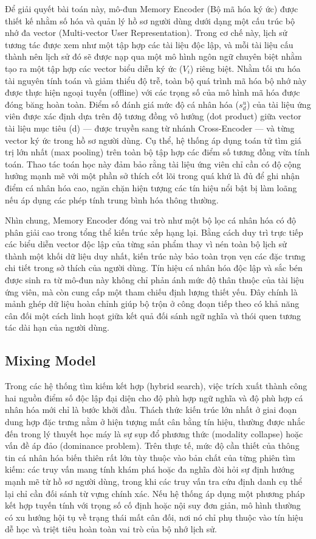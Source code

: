 Để giải quyết bài toán này, mô-đun Memory Encoder (Bộ mã hóa ký ức) được thiết kế nhằm số hóa và quản lý hồ sơ người dùng dưới dạng một cấu trúc bộ nhớ đa vector (Multi-vector User Representation). Trong cơ chế này, lịch sử tương tác được xem như một tập hợp các tài liệu độc lập, và mỗi tài liệu cấu thành nên lịch sử đó sẽ được nạp qua một mô hình ngôn ngữ chuyên biệt nhằm tạo ra một tập hợp các vector biểu diễn ký ức ($V_i$) riêng biệt. Nhằm tối ưu hóa tài nguyên tính toán và giảm thiểu độ trễ, toàn bộ quá trình mã hóa bộ nhớ này được thực hiện ngoại tuyến (offline) với các trọng số của mô hình mã hóa được đóng băng hoàn toàn. Điểm số đánh giá mức độ cá nhân hóa ($s_d^u$) của tài liệu ứng viên được xác định dựa trên độ tương đồng vô hướng (dot product) giữa vector tài liệu mục tiêu (d) — được truyền sang từ nhánh Cross-Encoder — và từng vector ký ức trong hồ sơ người dùng. Cụ thể, hệ thống áp dụng toán tử tìm giá trị lớn nhất (max pooling) trên toàn bộ tập hợp các điểm số tương đồng vừa tính toán. Thao tác toán học này đảm bảo rằng tài liệu ứng viên chỉ cần có độ cộng hưởng mạnh mẽ với một phần sở thích cốt lõi trong quá khứ là đủ để ghi nhận điểm cá nhân hóa cao, ngăn chặn hiện tượng các tín hiệu nổi bật bị làm loãng nếu áp dụng các phép tính trung bình hóa thông thường.

Nhìn chung, Memory Encoder đóng vai trò như một bộ lọc cá nhân hóa có độ phân giải cao trong tổng thể kiến trúc xếp hạng lại. Bằng cách duy trì trực tiếp các biểu diễn vector độc lập của từng sản phẩm thay vì nén toàn bộ lịch sử thành một khối dữ liệu duy nhất, kiến trúc này bảo toàn trọn vẹn các đặc trưng chi tiết trong sở thích của người dùng. Tín hiệu cá nhân hóa độc lập và sắc bén được sinh ra từ mô-đun này không chỉ phản ánh mức độ thân thuộc của tài liệu ứng viên, mà còn cung cấp một tham chiếu định lượng thiết yếu. Đây chính là mảnh ghép dữ liệu hoàn chỉnh giúp bộ trộn ở công đoạn tiếp theo có khả năng cân đối một cách linh hoạt giữa kết quả đối sánh ngữ nghĩa và thói quen tương tác dài hạn của người dùng.


\subsection{Mixing Model}

Trong các hệ thống tìm kiếm kết hợp (hybrid search), việc trích xuất thành công hai nguồn điểm số độc lập đại diện cho độ phù hợp ngữ nghĩa và độ phù hợp cá nhân hóa mới chỉ là bước khởi đầu. Thách thức kiến trúc lớn nhất ở giai đoạn dung hợp đặc trưng nằm ở hiện tượng mất cân bằng tín hiệu, thường được nhắc đến trong lý thuyết học máy là sự sụp đổ phương thức (modality collapse) hoặc vấn đề áp đảo (dominance problem). Trên thực tế, mức độ cần thiết của thông tin cá nhân hóa biến thiên rất lớn tùy thuộc vào bản chất của từng phiên tìm kiếm: các truy vấn mang tính khám phá hoặc đa nghĩa đòi hỏi sự định hướng mạnh mẽ từ hồ sơ người dùng, trong khi các truy vấn tra cứu định danh cụ thể lại chỉ cần đối sánh từ vựng chính xác. Nếu hệ thống áp dụng một phương pháp kết hợp tuyến tính với trọng số cố định hoặc nội suy đơn giản, mô hình thường có xu hướng hội tụ về trạng thái mất cân đối, nơi nó chỉ phụ thuộc vào tín hiệu dễ học và triệt tiêu hoàn toàn vai trò của bộ nhớ lịch sử.

